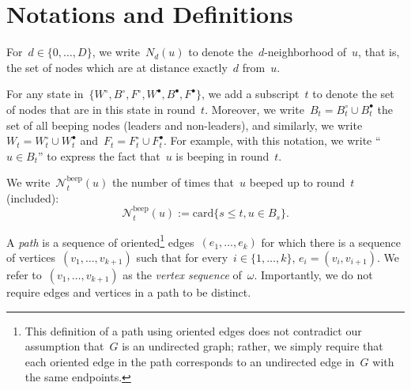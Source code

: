 \documentclass{article}
\newcommand{\rnote}[1]{{\color{myred} ({\bf Robin:} #1)}}
\newcommand{\inote}[1]{{\color{blue} ({\bf Isa:} #1)}}
\newcommand{\lead}{\bullet}
\newcommand{\nlead}{\circ}
\newcommand{\beepcount}{\mathcal{N}^{\mathrm{beep}}}
\begin{document}
\section{Notations and Definitions}

For~$d \in \{0,\ldots,D\}$, we write~$N_d(u)$ to denote the~$d$-neighborhood of~$u$, that is, the set of nodes which are at distance exactly~$d$ from~$u$.

For any state in~$\{W^\nlead,B^\nlead,F^\nlead,W^\lead,B^\lead,F^\lead\}$, we add a subscript~$t$ to denote the set of nodes that are in this state in round~$t$. Moreover, we write~$B_t = B^\nlead_t \cup B^\lead_t$ the set of all beeping nodes (leaders and non-leaders), and similarly, we write~$W_t = W^\nlead_t \cup W^\lead_t$ and~$F_t = F^\nlead_t \cup F^\lead_t$.
For example, with this notation, we write ``$u \in B_t$'' to express the fact that~$u$ is beeping in round~$t$.

We write~$\beepcount_t(u)$ the number of times that~$u$ beeped up to round~$t$ (included):
\begin{equation*}
    \beepcount_t(u) := \mathrm{card} \{ s \leq t, u \in B_s \}.
\end{equation*}


\begin{definition} [Paths] \label{def:paths}
    A {\em path} is a sequence of oriented\footnote{This definition of a path using oriented edges does not contradict our assumption that~$G$ is an undirected graph; rather, we simply require that each oriented edge in the path corresponds to an undirected edge in~$G$ with the same endpoints.} edges~$(e_1,\ldots,e_k)$ for which there is a sequence of vertices~$(v_1,\ldots,v_{k+1})$ such that for every~$i\in\{1,\ldots,k\}$, $e_i = (v_i,v_{i+1})$.
    We refer to~$(v_1,\ldots,v_{k+1})$ as the {\em vertex sequence} of~$\omega$.
    Importantly, we do not require edges and vertices in a path to be distinct.
\end{definition}
\end{document}

